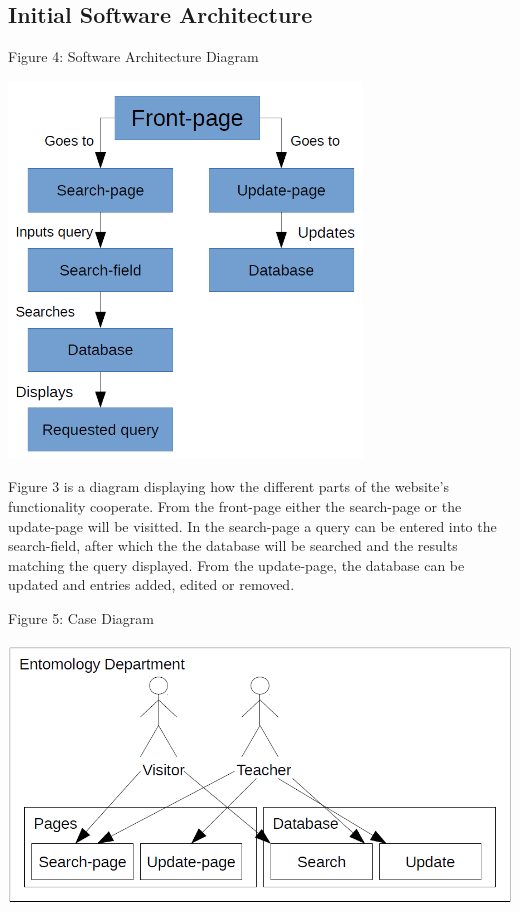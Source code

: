 \documentclass[12pt,a4paper]{article}
\begin{document}
\subsection{Initial Software Architecture}
\begin{center}
	Figure 4: Software Architecture Diagram
	
\includegraphics[height=100mm]{SoftwareArchitecture.png}
\end{center}
Figure 3 is a diagram displaying how the different parts of the website's functionality cooperate.
From the front-page either the search-page or the update-page will be visitted.
In the search-page a query can be entered into the search-field, after which the the database will be searched and the results matching the query displayed.
From the update-page, the database can be updated and entries added, edited or removed.	
\newpage
\begin{center}
	Figure 5: Case Diagram
	
	\includegraphics[height=70mm]{CaseDiagram.png}
\end{center}
\end{document}
